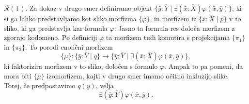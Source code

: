 \documentclass[../kategoricna_logika.tex]{subfiles}
\begin{document}
\begin{dokaz}
\begin{enumerate}[label=(\roman*)]
    $\mathcal{R}(\mathbb{T})$. Za dokaz v drugo smer definiramo objekt
    $\{ \bar{y}:\bar{Y} \mid \exists (\bar{x}:\bar{X} ) \varphi(\bar{x},\bar{y})\}$,
    ki si ga lahko predstavljamo
    kot sliko morfizma $\{ \varphi \}$,
    in morfizem iz $\{\bar{x}:\bar{X} \mid p\}$ v
    to sliko, ki ga predstavlja kar formula $\varphi$. Jasno ta
    formula res določa morfizem z zgornjo kodomeno. Po definiciji
    $\varphi$ ta morfizem tudi komutira s projekcijama $\{\pi_1\}$
    in $\{\pi_2\}$. To porodi enolični morfizem
    \[\{\mu\} : \{\bar{y}:\bar{Y} \mid q\} \to \{ \bar{y}:\bar{Y} \mid \exists (\bar{x}:\bar{X} ) \varphi(\bar{x},\bar{y})\},\]
    ki faktorizira morfizem v to sliko, določen s formulo
    $\varphi$. Ampak to pa pomeni, da mora biti $\{\mu\}$ izomorfizem,
    kajti v drugo smer imamo očitno inkluzijo slike. Torej, če
    predpostavimo $q(\bar{y})$, velja
    $$\exists (\bar{y}:\bar{Y}) \varphi(\bar{x},\bar{y}).$$
    


\end{enumerate}
\end{dokaz}
\end{document}
